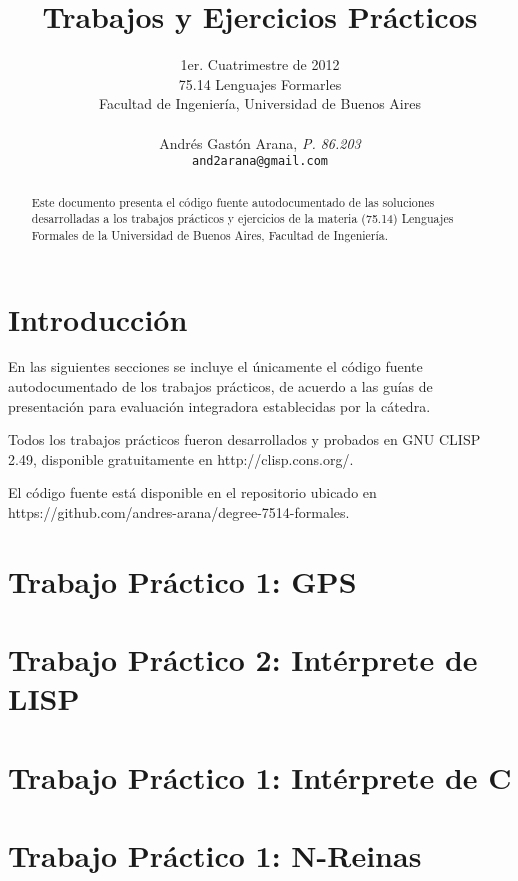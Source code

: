 \documentclass[a4paper,11pt]{article}
\title{\textbf{Trabajos y Ejercicios Prácticos}}
\author{
  \normalsize{1er. Cuatrimestre de 2012}                           \\
  \normalsize{75.14 Lenguajes Formarles}                           \\
  \normalsize{Facultad de Ingeniería, Universidad de Buenos Aires} \\ \\
  Andrés Gastón Arana, \textit{P. 86.203}                          \\
  \texttt{and2arana@gmail.com}
}
\date{}
\begin{document}
\thispagestyle{empty}
\maketitle

\begin{abstract}

  Este documento presenta el código fuente autodocumentado de las soluciones
  desarrolladas a los trabajos prácticos y ejercicios de la materia (75.14)
  Lenguajes Formales de la Universidad de Buenos Aires, Facultad de Ingeniería.

\end{abstract}

\clearpage

\section{Introducción}

En las siguientes secciones se incluye el únicamente el código fuente
autodocumentado de los trabajos prácticos, de acuerdo a las guías de
presentación para evaluación integradora establecidas por la cátedra.

Todos los trabajos prácticos fueron desarrollados y probados en GNU CLISP 2.49,
disponible gratuitamente en http://clisp.cons.org/.

El código fuente está disponible en el repositorio ubicado en
https://github.com/andres-arana/degree-7514-formales.



\clearpage


\section{Trabajo Práctico 1: GPS}


\clearpage

\section{Trabajo Práctico 2: Intérprete de LISP}


\clearpage

\section{Trabajo Práctico 1: Intérprete de C}


\clearpage

\section{Trabajo Práctico 1: N-Reinas}


\clearpage
\end{document}

